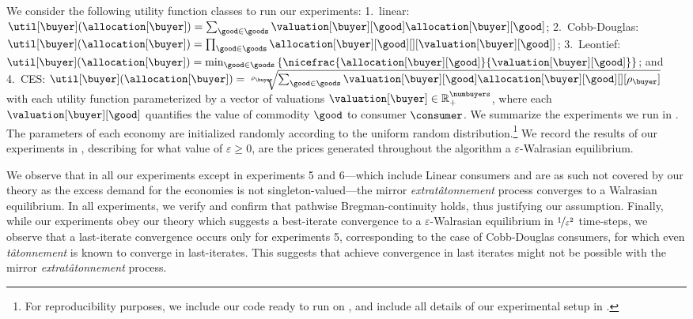 
% 

We consider the following utility function classes to run our experiments:
1.~linear: $\util[\buyer](\allocation[\buyer]) = \sum_{\good \in \goods} \valuation[\buyer][\good] \allocation[\buyer][\good]$; 
2.~Cobb-Douglas:  $\util[\buyer](\allocation[\buyer]) = \prod_{\good \in \goods} \allocation[\buyer][\good][][{\valuation[\buyer][\good]}]$; 
3.~Leontief:  $\util[\buyer](\allocation[\buyer]) = \min_{\good \in \goods} \left\{ \nicefrac{\allocation[\buyer][\good]}{\valuation[\buyer][\good]}\right\}$; 
and 4.~CES: $\util[\buyer](\allocation[\buyer]) = \sqrt[{\rho_\buyer}]{ \sum_{\good \in \goods} \valuation[\buyer][\good] \allocation[\buyer][\good][][{\rho_\buyer}]}$ with each utility function parameterized by a vector of valuations $\valuation[\buyer] \in \mathbb{R}_+^{\numbuyers}$, where each $\valuation[\buyer][\good]$ quantifies the value of commodity $\good$ to consumer $\consumer$. 
We summarize the experiments we run in . The parameters of each economy are initialized randomly according to the uniform random distribution.\footnote{ For reproducibility purposes, we include our code ready to run on \coderepo, and include all details of our experimental setup in .} We record the results of our experiments in , describing for what value of $\varepsilon \geq 0$, are the prices generated throughout the algorithm a $\varepsilon$-Walrasian equilibrium.

We observe that in all our experiments except in experiments 5 and 6---which include Linear consumers and are as such not covered by our theory as the excess demand for the economies is not singleton-valued---the mirror \emph{extrat\^atonnement} process converges to a Walrasian equilibrium. In all experiments, we verify and confirm that pathwise Bregman-continuity holds, thus justifying our assumption. Finally, while our experiments obey our theory which suggests a best-iterate convergence to a $\varepsilon$-Walrasian equilibrium in $\nicefrac{1}{\varepsilon^2}$ time-steps, we observe that a last-iterate convergence occurs only for experiments 5, corresponding to the case of Cobb-Douglas consumers, for which even \emph{t\^atonnement} is known to converge in last-iterates. This suggests that achieve convergence in last iterates might not be possible with the mirror \emph{extrat\^atonnement} process.


% 
